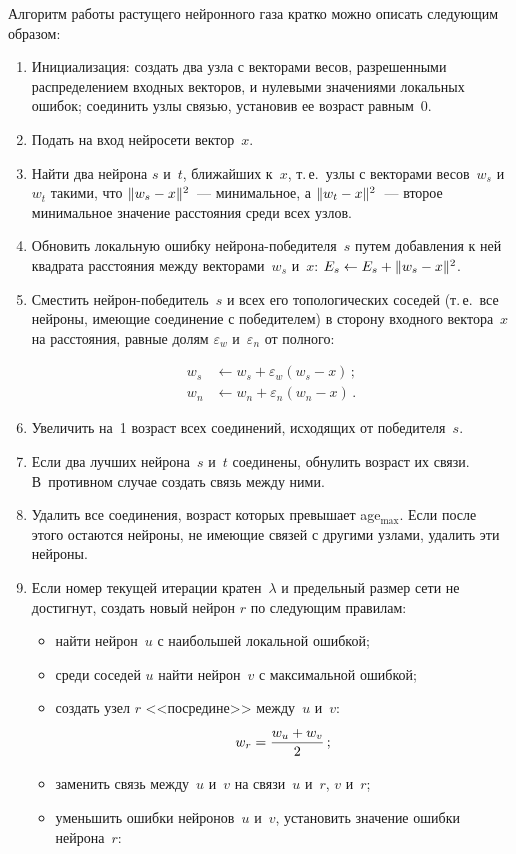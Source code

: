 \begin{multicols}{2}
Алгоритм работы растущего нейронного газа кратко можно описать следующим образом:
\begin{enumerate}
\item Инициализация: создать два узла с векторами весов, разрешенными распределением входных 
векторов, и нулевыми значениями локальных ошибок; соединить узлы связью, установив ее 
возраст равным~0.
\item Подать на вход нейросети вектор~$x$.
\item Найти два нейрона $s$ и~$t$, ближайших к~$x$, т.\,е.\ узлы с векторами весов~$w_s$ и 
$w_t$ такими, что $\Vert w_s\hm-x\Vert^2$~--- минимальное, а $\Vert w_t\hm-x\Vert^2$~--- второе 
минимальное значение расстояния среди всех узлов.
\item Обновить локальную ошибку ней\-ро\-на-по\-бе\-ди\-те\-ля~$s$ путем добавления к ней 
квадрата расстояния между векторами~$w_s$ и~$x$: $E_s\leftarrow E_s\hm+\Vert w_s\hm-
x\Vert^2$.\\[-13pt]
\item Сместить нейрон-по\-бе\-ди\-тель~$s$ и всех его топологических соседей (т.\,е.\ все нейроны, 
име\-ющие соединение с победителем) в сторону входного вектора~$x$ на расстояния, равные долям 
$\varepsilon_w$ и~$\varepsilon_n$ от полного:

\noindent
\begin{align*}
w_s&\leftarrow w_s+\varepsilon_w(w_s-x)\,;\\
w_n&\leftarrow w_n+\varepsilon_n(w_n-x)\,.
\end{align*}
\item Увеличить на~1 возраст всех соединений, исходящих от победителя~$s$.\\[-13pt]

\item Если два лучших нейрона~$s$ и~$t$ соединены, обнулить возраст их связи. В~противном 
случае создать связь между ними.\\[-13pt]
\item Удалить все соединения, возраст которых превышает age$_{\max}$. Если после этого остаются 
нейроны, не имеющие связей с другими узлами, удалить эти нейроны.\\[-13pt]
\item Если номер текущей итерации кратен~$\lambda$ и предельный размер сети не достигнут, 
создать новый нейрон $r$ по следующим правилам:\\[-13pt]
\begin{itemize}
\item найти нейрон~$u$ с наибольшей локальной ошибкой;\\[-14pt]
\item среди соседей $u$ найти нейрон~$v$ с максимальной ошибкой;\\[-14pt]
\item создать узел $r$ <<посредине>> между~$u$ и~$v$:
$$
w_r =\displaystyle\frac{\displaystyle w_u+w_v\mathstrut}{\displaystyle 2\mathstrut}\,;
$$
\item заменить связь между~$u$ и~$v$ на связи~$u$ и~$r$, $v$ и~$r$;\\[-14pt]
\item уменьшить ошибки нейронов~$u$ и~$v$, установить значение ошибки нейрона~$r$:


\end{itemize}
\end{enumerate}
\end{multicols}
